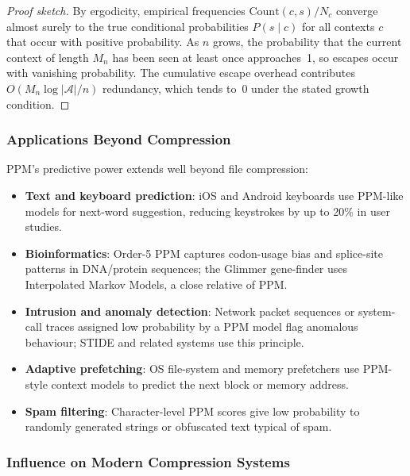 \begin{proof}[Proof sketch]
By ergodicity, empirical frequencies $\text{Count}(c,s)/N_c$ converge almost surely
to the true conditional probabilities $P(s \mid c)$ for all contexts $c$ that occur
with positive probability. As $n$ grows, the probability that the current context of
length $M_n$ has been seen at least once approaches~1, so escapes occur with
vanishing probability. The cumulative escape overhead contributes $O(M_n \log
|\mathcal{A}| / n)$ redundancy, which tends to~0 under the stated growth condition.
\end{proof}

\subsubsection{Applications Beyond Compression}

PPM's predictive power extends well beyond file compression:
\begin{itemize}
    \item \textbf{Text and keyboard prediction}: iOS and Android keyboards use
          PPM-like models for next-word suggestion, reducing keystrokes by up to
          20\% in user studies.
    \item \textbf{Bioinformatics}: Order-5 PPM captures codon-usage bias and
          splice-site patterns in DNA/protein sequences; the Glimmer gene-finder
          uses Interpolated Markov Models, a close relative of PPM.
    \item \textbf{Intrusion and anomaly detection}: Network packet sequences or
          system-call traces assigned low probability by a PPM model flag
          anomalous behaviour; STIDE and related systems use this principle.
    \item \textbf{Adaptive prefetching}: OS file-system and memory prefetchers use
          PPM-style context models to predict the next block or memory address.
    \item \textbf{Spam filtering}: Character-level PPM scores give low probability
          to randomly generated strings or obfuscated text typical of spam.
\end{itemize}

\subsubsection{Influence on Modern Compression Systems}

